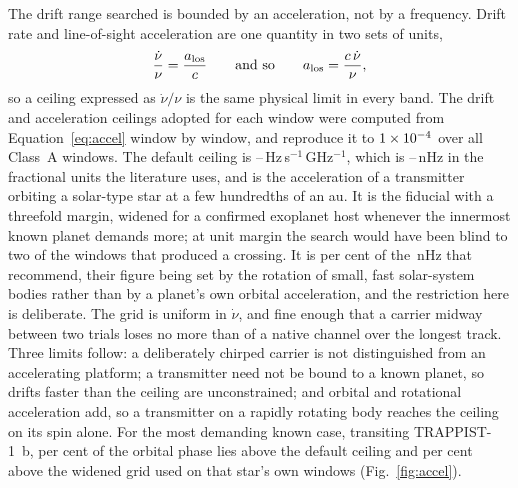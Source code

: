 The drift range searched is bounded by an acceleration, not by a
frequency. Drift rate and line-of-sight acceleration are one quantity in
two sets of units,
%
\begin{equation}
\frac{\dot\nu}{\nu}=\frac{a_{\rm los}}{c}
\qquad\text{and so}\qquad
a_{\rm los}=\frac{c\,\dot\nu}{\nu},
\label{eq:accel}
\end{equation}
%
so a ceiling expressed as $\dot\nu/\nu$ is the same physical limit in
every band. The drift and acceleration ceilings adopted for each window
were computed from Equation~\ref{eq:accel} window by window, and
reproduce it to $1\times10^{-4}$ over all \DriftRelNWin{} Class~A windows.
The default
ceiling is \DriftCeilLo--\DriftCeilHi\,Hz\,s$^{-1}$\,GHz$^{-1}$, which is
\DriftCeilLo--\DriftCeilHi\,nHz in the fractional units the literature
uses, and is the acceleration of a transmitter orbiting a solar-type star
at a few hundredths of an au. It is the \citet{Mason2025} fiducial with a
threefold margin, widened for a confirmed exoplanet host whenever the
innermost known planet demands more; at unit margin the search would have
been blind to two of the windows that produced a crossing. It is
\AccelSheikhPct{} per cent of the \AccelSheikhNHz\,nHz that
\citet{Sheikh2019} recommend, their figure being set by the rotation of
small, fast solar-system bodies rather than by a planet's own orbital
acceleration, and the restriction here is deliberate. The grid is uniform
in $\dot\nu$, and fine enough
that a carrier midway between two trials loses no more than
\DriftGridFineHalf{} of a native channel over the longest track. Three
limits follow: a deliberately chirped carrier is not distinguished from an
accelerating platform; a transmitter need not be bound to a known planet,
so drifts faster than the ceiling are unconstrained; and orbital and
rotational acceleration add, so a transmitter on a rapidly rotating body
reaches the ceiling on its spin alone. For the most demanding known case,
transiting TRAPPIST-1~b, \TrapPhaseHi{} per cent of the orbital phase lies
above the default ceiling and \TrapPhaseLo{} per cent above the widened
grid used on that star's own windows (Fig.~\ref{fig:accel}).

